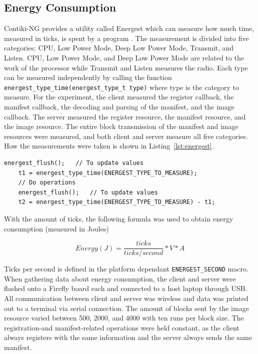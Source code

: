 \documentclass[0-thesis.tex]{subfiles}
\begin{document}
\subsection{Energy Consumption}
\label{ssec:energy-consumption}
Contiki-NG provides a utility called Energest which can measure how much time, measured in
ticks, is spent by a program \parencite{energest}. The measurement is divided into five
categories: CPU, Low Power Mode, Deep Low Power Mode, Transmit, and Listen. CPU, Low Power
Mode, and Deep Low Power Mode are related to the work of the processor while Transmit and
Listen measures the radio. Each type can be measured independently by calling the function
\texttt{energest\_type\_time(energest\_type\_t type)} where type is the category to
measure. For the experiment, the client measured the register callback, the manifest
callback, the decoding and parsing of the manifest, and the image callback. The server
measured the register resource, the manifest resource, and the image resource. The entire
block transmission of the manifest and image resources were measured, and both client and
server measure all five categories. How the measurements were taken is shown in
Listing~\ref{lst:energest}.

\begin{lstlisting}[language=manifest, caption={How to measure ticks in energest.}, label=lst:energest]
    energest_flush();   // To update values
    t1 = energest_type_time(ENERGEST_TYPE_TO_MEASURE);
    // Do operations
    energest_flush();   // To update values
    t2 = energest_type_time(ENERGEST_TYPE_TO_MEASURE) - t1;
\end{lstlisting}

With the amount of ticks, the following formula was used to obtain energy consumption
(measured in Joules)

$$ Energy (J) = \frac{ticks}{ticks/second} * V * A $$

Ticks per second is defined in the platform dependant \texttt{ENERGEST\_SECOND} macro.
When gathering data about energy consumption, the client and server were flashed onto a
Firefly board each and connected to a host laptop through USB. All communication between
client and server was wireless and data was printed out to a terminal via serial
connection. The amount of blocks sent by the image resource varied between 500, 2000, and
4000 with ten runs per block size. The registration-and manifest-related operations were
held constant, as the client always registers with the same information and the server
always sends the same manifest. 
\end{document}
